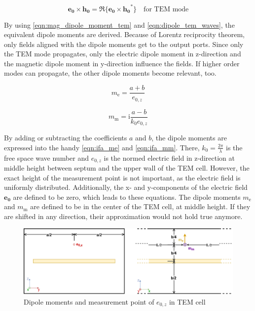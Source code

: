 \begin{equation}
    \mathbf{e_0}\times\mathbf{h_0}=\Re\{\mathbf{e_0}\times\mathbf{h_0}^*\} \quad\text{for TEM mode}
    \label{eqn:equivalent_tem}
\end{equation}


By using \autoref{eqn:mag_dipole_moment_tem} and \autoref{eqn:dipole_tem_waves}, the equivalent dipole moments are derived. Because of Lorentz reciprocity theorem, only fields aligned with the dipole moments get to the output ports. Since only the TEM mode propagates, only the electric dipole moment in z-direction and the magnetic dipole moment in y-direction influence the fields. If higher order modes can propagate, the other dipole moments become relevant, too.



\begin{equation}
    m_{\mathrm{e}}=\frac{a+b}{e_{0,z}}
    \label{eqn:ifa_me}
\end{equation}

\begin{equation}
    m_{\mathrm{m}}=\mathrm{i}\frac{a-b}{k_0  e_{0,z}}
    \label{eqn:ifa_mm}
\end{equation}

By adding or subtracting the coefficients $a$ and $b$, the dipole moments are expressed into the handy \autoref{eqn:ifa_me} and \autoref{eqn:ifa_mm}. There, $k_0=\frac{2\pi}{\lambda}$ is the free space wave number and $e_{0,z}$ is the normed electric field in z-direction at middle height between septum and the upper wall of the TEM cell. However, the exact height of the measurement point is not important, as the electric field is uniformly distributed. Additionally, the x- and y-components of the electric field $\mathbf{e_{0}}$ are defined to be zero, which leads to these equations. The dipole moments $m_{\mathrm{e}}$ and $m_{\mathrm{m}}$ are defined to be in the center of the TEM cell, at middle height. If they are shifted in any direction, their approximation would not hold true anymore.

\begin{figure}[h]
    \centering
    \includegraphics[width=1\linewidth]{Documentation//content//30_simulations//img/sketch_dipoles_tem_cell.png}
    \caption{Dipole moments and measurement point of $e_{0,z}$ in TEM cell}
    \label{fig:sketch_dipoles_tem_cell}
\end{figure}

